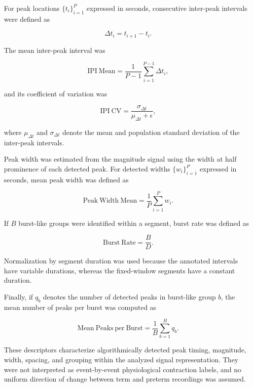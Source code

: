 \documentclass[10pt,letterpaper]{article}
\begin{document}
For peak locations $\{t_i\}_{i=1}^{P}$ expressed in seconds, consecutive inter-peak intervals were defined as

\begin{equation}
\Delta t_i = t_{i+1}-t_i .
\end{equation}

The mean inter-peak interval was

\begin{equation}
\mathrm{IPI\ Mean}
=
\frac{1}{P-1}
\sum_{i=1}^{P-1}\Delta t_i ,
\end{equation}

and its coefficient of variation was

\begin{equation}
\mathrm{IPI\ CV}
=
\frac{\sigma_{\Delta t}}
{\mu_{\Delta t}+\epsilon},
\end{equation}

where $\mu_{\Delta t}$ and $\sigma_{\Delta t}$ denote the mean and population standard deviation of the inter-peak intervals.

Peak width was estimated from the magnitude signal using the width at half prominence of each detected peak. For detected widths $\{w_i\}_{i=1}^{P}$ expressed in seconds, mean peak width was defined as

\begin{equation}
\mathrm{Peak\ Width\ Mean}
=
\frac{1}{P}\sum_{i=1}^{P}w_i .
\end{equation}

If $B$ burst-like groups were identified within a segment, burst rate was defined as

\begin{equation}
\mathrm{Burst\ Rate}
=
\frac{B}{D}.
\end{equation}

Normalization by segment duration was used because the annotated intervals have variable durations, whereas the fixed-window segments have a constant duration.

Finally, if $q_b$ denotes the number of detected peaks in burst-like group $b$, the mean number of peaks per burst was computed as

\begin{equation}
\mathrm{Mean\ Peaks\ per\ Burst}
=
\frac{1}{B}\sum_{b=1}^{B}q_b .
\end{equation}

These descriptors characterize algorithmically detected peak timing, magnitude, width, spacing, and grouping within the analyzed signal representation. They were not interpreted as event-by-event physiological contraction labels, and no uniform direction of change between term and preterm recordings was assumed.
\end{document}

